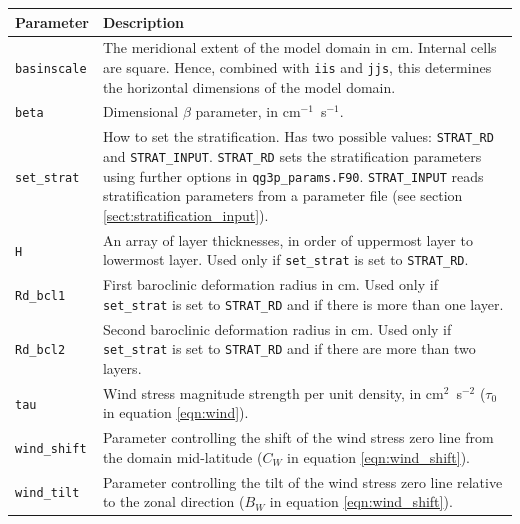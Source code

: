 \documentclass[a4paper]{book}
\begin{document}
\begin{longtable}{ | p{} | p{} | }
  \hline
  Parameter & Description \\
  \hline
  \endhead
  \verb+basinscale+ & The meridional extent of the model domain in cm. Internal
                      cells are square. Hence, combined with \verb+iis+ and
                      \verb+jjs+, this determines the horizontal dimensions of
                      the model domain. \\
  \verb+beta+       & Dimensional $\beta$ parameter, in
                      cm${}^{-1}$~s${}^{-1}$. \\
  \verb+set_strat+  & How to set the stratification. Has two possible values:
                      \verb+STRAT_RD+ and \verb+STRAT_INPUT+. \verb+STRAT_RD+
                      sets the stratification parameters using further
                      options in \verb+qg3p_params.F90+. \verb+STRAT_INPUT+
                      reads stratification parameters from a parameter file (see
                      section \ref{sect:stratification_input}). \\
  \verb+H+          & An array of layer thicknesses, in order of uppermost layer
                      to lowermost layer. Used only if \verb+set_strat+ is set
                      to \verb+STRAT_RD+. \\
  \verb+Rd_bcl1+    & First baroclinic deformation radius in cm. Used only if
                      \verb+set_strat+ is set to \verb+STRAT_RD+ and if there is
                      more than one layer. \\
  \verb+Rd_bcl2+    & Second baroclinic deformation radius in cm. Used only if
                      \verb+set_strat+ is set to \verb+STRAT_RD+ and if there
                      are more than two layers. \\
  \verb+tau+        & Wind stress magnitude strength per unit density, in
                      cm${}^2$~s${}^{-2}$ ($\tau_0$ in equation
                      \eqref{eqn:wind}). \\
  \verb+wind_shift+ & Parameter controlling the shift of the wind stress zero
                      line from the domain mid-latitude ($C_W$ in equation
                      \eqref{eqn:wind_shift}). \\
  \verb+wind_tilt+  & Parameter controlling the tilt of the wind stress zero
                      line relative to the zonal direction ($B_W$ in equation
                      \eqref{eqn:wind_shift}). \\

\end{longtable}
\end{document}

